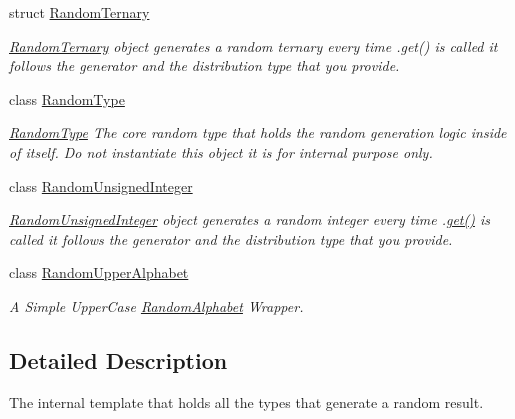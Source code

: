 \begin{DoxyCompactItemize}
struct \mbox{\hyperlink{structtestcaser_1_1maker_1_1types_1_1RandomTernary}{Random\+Ternary}}
\begin{DoxyCompactList}\small\item\em \mbox{\hyperlink{structtestcaser_1_1maker_1_1types_1_1RandomTernary}{Random\+Ternary}} object generates a random ternary every time .get() is called it follows the generator and the distribution type that you provide. \end{DoxyCompactList}\item 
class \mbox{\hyperlink{classtestcaser_1_1maker_1_1types_1_1RandomType}{Random\+Type}}
\begin{DoxyCompactList}\small\item\em \mbox{\hyperlink{classtestcaser_1_1maker_1_1types_1_1RandomType}{Random\+Type}} The core random type that holds the random generation logic inside of itself. Do not instantiate this object it is for internal purpose only. \end{DoxyCompactList}\item 
class \mbox{\hyperlink{classtestcaser_1_1maker_1_1types_1_1RandomUnsignedInteger}{Random\+Unsigned\+Integer}}
\begin{DoxyCompactList}\small\item\em \mbox{\hyperlink{classtestcaser_1_1maker_1_1types_1_1RandomUnsignedInteger}{Random\+Unsigned\+Integer}} object generates a random integer every time .\mbox{\hyperlink{classtestcaser_1_1maker_1_1types_1_1RandomUnsignedInteger_a73504939f740445d56b0bd00257f5480}{get()}} is called it follows the generator and the distribution type that you provide. \end{DoxyCompactList}\item 
class \mbox{\hyperlink{classtestcaser_1_1maker_1_1types_1_1RandomUpperAlphabet}{Random\+Upper\+Alphabet}}
\begin{DoxyCompactList}\small\item\em A Simple Upper\+Case \mbox{\hyperlink{classtestcaser_1_1maker_1_1types_1_1RandomAlphabet}{Random\+Alphabet}} Wrapper. \end{DoxyCompactList}\end{DoxyCompactItemize}


\subsection{Detailed Description}
The internal template that holds all the types that generate a random result. 

